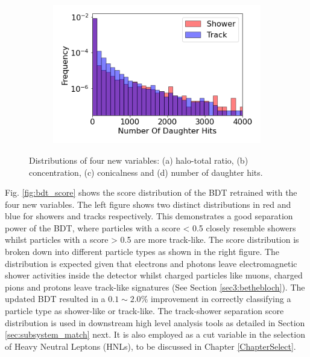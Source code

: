 \begin{figure}[hb!]
\begin{subfigure}[b]{0.45\textwidth}
            \caption{}%
        \end{subfigure}
        \hfill
        \begin{subfigure}[b]{0.45\textwidth}  
            \centering 
            \includegraphics[width=\textwidth]{Feature_Number_Of_Daughter_Hits}
            \caption{}%
        \end{subfigure}
        \caption[New Variable Distributions of the Track-Shower Separation BDT]{
	Distributions of four new variables: (a) halo-total ratio, (b) concentration, (c) conicalness and (d) number of daughter hits.
	}
        \label{fig:bdt_features}
\end{figure}

Fig. \ref{fig:bdt_score} shows the score distribution of the BDT retrained with the four new variables.
The left figure shows two distinct distributions in red and blue for showers and tracks respectively.
This demonstrates a good separation power of the BDT, where particles with a score < 0.5 closely resemble showers whilst particles with a score > 0.5 are more track-like.
The score distribution is broken down into different particle types as shown in the right figure.
The distribution is expected given that electrons and photons leave electromagnetic shower activities inside the detector whilst charged particles like muons, charged pions and protons leave track-like signatures (See Section \ref{sec3:bethebloch}). 
The updated BDT resulted in a $0.1\sim2.0\%$ improvement in correctly classifying a particle type as shower-like or track-like.
The track-shower separation score distribution is used in downstream high level analysis tools as detailed in Section \ref{sec:subsystem_match} next.
It is also employed as a cut variable in the selection of Heavy Neutral Leptons (HNLs), to be discussed in Chapter \ref{ChapterSelect}.

